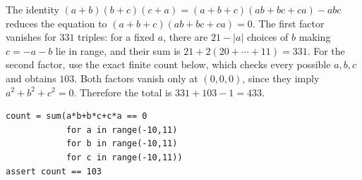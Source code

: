 The identity $(a+b)(b+c)(c+a)=(a+b+c)(ab+bc+ca)-abc$ reduces the equation to $(a+b+c)(ab+bc+ca)=0$. The first factor vanishes for $331$ triples: for a fixed $a$, there are $21-|a|$ choices of $b$ making $c=-a-b$ lie in range, and their sum is $21+2(20+\cdots+11)=331$. For the second factor, use the exact finite count below, which checks every possible $a,b,c$ and obtains $103$. Both factors vanish only at $(0,0,0)$, since they imply $a^2+b^2+c^2=0$. Therefore the total is $331+103-1=\boxed{433}$.
\begin{verbatim}
count = sum(a*b+b*c+c*a == 0
            for a in range(-10,11)
            for b in range(-10,11)
            for c in range(-10,11))
assert count == 103
\end{verbatim}
